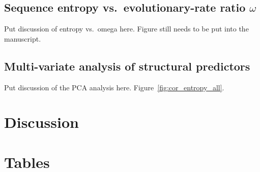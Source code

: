 \documentclass[12pt]{article}
\begin{document}
\subsection*{Sequence entropy vs.\ evolutionary-rate ratio $\omega$}


{\color{blue} Put discussion of entropy vs.\ omega here. Figure still needs to be put into the manuscript.}

\subsection*{Multi-variate analysis of structural predictors}

{\color{blue} Put discussion of the PCA analysis here. Figure~\ref{fig:cor_entropy_all}.}
	
    	
\section*{Discussion}





\newpage

\section*{Tables}
\end{document}
